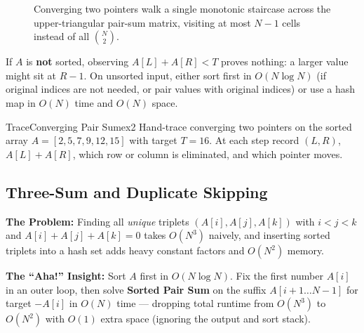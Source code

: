 \documentclass[11pt,a4paper]{article}
\theoremstyle{definition}
\newcommand{\painbeat}{\textbf{\color{accentamber}The Problem:} }
\newcommand{\ahabeat}{\textbf{\color{accentteal}The ``Aha!'' Insight:} }
\begin{document}
\begin{figure}[htbp]
\caption{Converging two pointers walk a single monotonic staircase across the upper-triangular pair-sum matrix, visiting at most $N - 1$ cells instead of all $\binom{N}{2}$.}
\label{fig:converging_grid}
\end{figure}

\begin{watchoutbox}
If $A$ is \textbf{not} sorted, observing $A[L] + A[R] < T$ proves nothing: a larger value might sit at $R - 1$. On unsorted input, either sort first in $O(N \log N)$ (if original indices are not needed, or pair values with original indices) or use a hash map in $O(N)$ time and $O(N)$ space.
\end{watchoutbox}

\begin{tryitbox}{Trace}{Converging Pair Sum}{ex2}
Hand-trace converging two pointers on the sorted array $A = [2, 5, 7, 9, 12, 15]$ with target $T = 16$. At each step record $(L, R)$, $A[L] + A[R]$, which row or column is eliminated, and which pointer moves.
\end{tryitbox}

\subsection{Three-Sum and Duplicate Skipping}

\painbeat Finding all \emph{unique} triplets $(A[i], A[j], A[k])$ with $i < j < k$ and $A[i] + A[j] + A[k] = 0$ takes $O(N^3)$ naively, and inserting sorted triplets into a hash set adds heavy constant factors and $O(N^2)$ memory.

\ahabeat Sort $A$ first in $O(N \log N)$. Fix the first number $A[i]$ in an outer loop, then solve \textbf{Sorted Pair Sum} on the suffix $A[i+1 \dots N-1]$ for target $-A[i]$ in $O(N)$ time --- dropping total runtime from $O(N^3)$ to $O(N^2)$ with $O(1)$ extra space (ignoring the output and sort stack).
\end{document}
